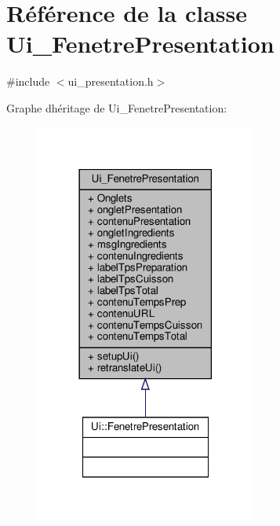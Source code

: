 \hypertarget{class_ui___fenetre_presentation}{}\section{Référence de la classe Ui\+\_\+\+Fenetre\+Presentation}
\label{class_ui___fenetre_presentation}


{\ttfamily \#include $<$ui\+\_\+presentation.\+h$>$}



Graphe d\textquotesingle{}héritage de Ui\+\_\+\+Fenetre\+Presentation\+:
\nopagebreak
\begin{figure}[H]
\begin{center}
\leavevmode
\includegraphics[width=206pt]{class_ui___fenetre_presentation__inherit__graph}
\end{center}
\end{figure}



